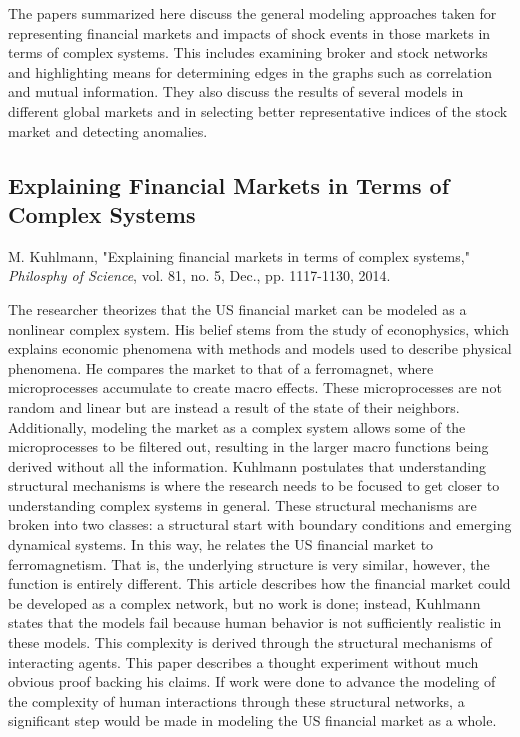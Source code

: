 \documentclass[12pt]{article}
\begin{document}
The papers summarized here discuss the general modeling approaches taken for representing financial markets and impacts of shock events in those markets in terms of complex systems. This includes examining broker and stock networks and highlighting means for determining edges in the graphs such as correlation and mutual information. They also discuss the results of several models in different global markets and in selecting better representative indices of the stock market and detecting anomalies.


\subsection{Explaining Financial Markets in Terms of Complex Systems}
M. Kuhlmann, "Explaining financial markets in terms of complex systems," \textit{Philosphy of Science}, vol. 81, no. 5, Dec., pp. 1117-1130, 2014. %
\newline

The researcher theorizes that the US financial market can be modeled as a nonlinear complex system. His belief stems from the study of econophysics, which explains economic phenomena with methods and models used to describe physical phenomena. He compares the market to that of a ferromagnet, where microprocesses accumulate to create macro effects. These microprocesses are not random and linear but are instead a result of the state of their neighbors. Additionally, modeling the market as a complex system allows some of the microprocesses to be filtered out, resulting in the larger macro functions being derived without all the information. Kuhlmann postulates that understanding structural mechanisms is where the research needs to be focused to get closer to understanding complex systems in general. These structural mechanisms are broken into two classes: a structural start with boundary conditions and emerging dynamical systems. In this way, he relates the US financial market to ferromagnetism. That is, the underlying structure is very similar, however, the function is entirely different. This article describes how the financial market could be developed as a complex network, but no work is done; instead, Kuhlmann states that the models fail because human behavior is not sufficiently realistic in these models. This complexity is derived through the structural mechanisms of interacting agents. This paper describes a thought experiment without much obvious proof backing his claims. If work were done to advance the modeling of the complexity of human interactions through these structural networks, a significant step would be made in modeling the US financial market as a whole.
\end{document}
